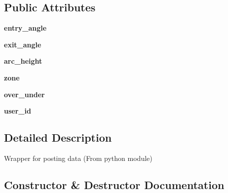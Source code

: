 \subsection*{Public Attributes}
\begin{DoxyCompactItemize}
\item 
\mbox{\label{classNetworking_1_1Networking__Python_a58abc058592ac24e364ea00206ab453f}} 
{\bfseries entry\+\_\+angle}
\item 
\mbox{\label{classNetworking_1_1Networking__Python_a1f85b9e248fd9dfa2a963c26f1f71f6f}} 
{\bfseries exit\+\_\+angle}
\item 
\mbox{\label{classNetworking_1_1Networking__Python_ae8ed7fa3f7ddc597f4ff6dda691e531a}} 
{\bfseries arc\+\_\+height}
\item 
\mbox{\label{classNetworking_1_1Networking__Python_af605c3d83b0746d02195d383f5ea18c0}} 
{\bfseries zone}
\item 
\mbox{\label{classNetworking_1_1Networking__Python_ae252847adea9f0e9bbffdb4d479685ec}} 
{\bfseries over\+\_\+under}
\item 
\mbox{\label{classNetworking_1_1Networking__Python_a0bd978dc97e9bc5997b8464907848e3e}} 
{\bfseries user\+\_\+id}
\end{DoxyCompactItemize}


\subsection{Detailed Description}
\begin{DoxyVerb}Wrapper for posting data (From python module) \end{DoxyVerb}
 

\subsection{Constructor \& Destructor Documentation}
\mbox{\label{classNetworking_1_1Networking__Python_ad8b3ecf029eb27fbfa4557488cd7ecb5}} 
